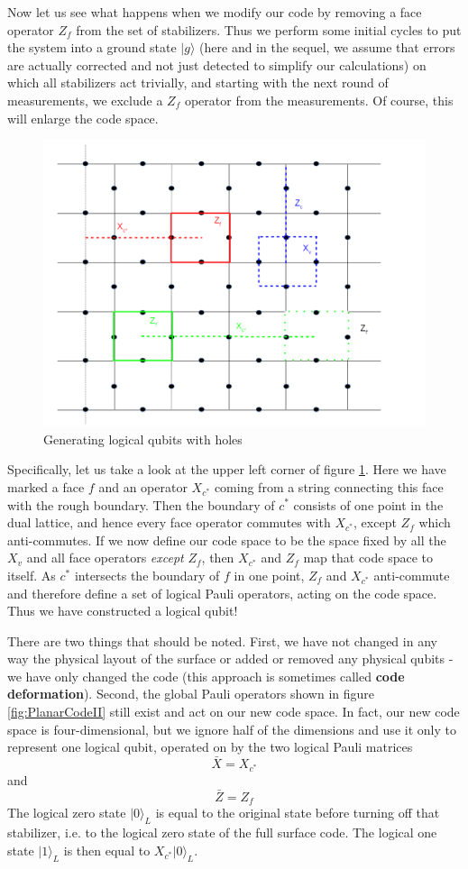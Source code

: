 \documentclass[a4paper, draft]{article}
\theoremstyle{own}
\theoremstyle{remark}
\begin{document}
Now let us see what happens when we modify our code by removing a face operator $Z_f$ from the set of stabilizers. Thus we perform some initial cycles to put the system into a ground state $|g \rangle$ (here and in the sequel, we assume that errors are actually corrected and not just detected to simplify our calculations) on which all stabilizers act trivially, and starting with the next round of measurements, we exclude a $Z_f$ operator from the measurements. Of course, this will enlarge the code space. 

\begin{figure}[ht]
\centering
\includegraphics[width=0.7\linewidth]{images/Holes}
\caption[Generating logical qubits with holes]{Generating logical qubits with holes}
\label{fig:Holes}
\end{figure}


Specifically, let us take a look at the upper left corner of figure \ref{fig:Holes}. Here we have marked a face $f$ and an operator $X_{c^*}$ coming from a string connecting this face with the rough boundary. Then the boundary of $c^*$ consists of one point in the dual lattice, and hence every face operator commutes with $X_{c^*}$, except $Z_f$ which anti-commutes. If we now define our code space to be the space fixed by all the $X_v$ and all face operators \emph{except} $Z_f$, then $X_{c^*}$ and $Z_f$ map that code space to itself. As $c^*$ intersects the boundary of $f$ in one point, $Z_f$ and $X_{c^*}$ anti-commute and therefore define a set of logical Pauli operators, acting on the code space. Thus we have constructed a logical qubit! 

There are two things that should be noted. First, we have not changed in any way the physical layout of the surface or added or removed any physical qubits - we have only changed the code (this approach is sometimes called {\bf code deformation}). Second, the global Pauli operators shown in figure \ref{fig:PlanarCodeII} still exist and act on our new code space. In fact, our new code space is four-dimensional, but we ignore half of the dimensions and use it only to represent one logical qubit, operated on by the two logical Pauli matrices
$$
\bar{X} = X_{c^*} 
$$
and
$$
\bar{Z} = Z_f
$$
The logical zero state $|0 \rangle_L$ is equal to the original state before turning off that stabilizer, i.e. to the logical zero state of the full surface code. The logical one state $|1\rangle_L$ is then equal to $X_{c^*} |0 \rangle_L$. 
\end{document}
